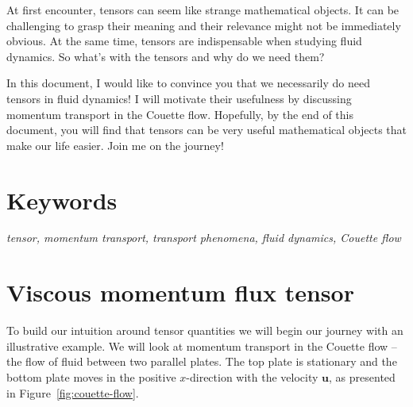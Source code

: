 \documentclass[10pt,twocolumn]{article}
\begin{document}
\setlength{\parindent}{0em}
\setlength{\parskip}{0.5em}

\small

At first encounter, tensors can seem like strange mathematical objects. It can be challenging to grasp their meaning and their relevance might not be immediately obvious. At the same time, tensors are indispensable when studying fluid dynamics. So what's with the tensors and why do we need them?

In this document, I would like to convince you that we necessarily do need tensors in fluid dynamics! I will motivate their usefulness by discussing momentum transport in the Couette flow. Hopefully, by the end of this document, you will find that tensors can be very useful mathematical objects that make our life easier. Join me on the journey!

\section*{Keywords}

\textit{tensor, momentum transport, transport phenomena, fluid dynamics, Couette flow}


\section*{Viscous momentum flux tensor}

To build our intuition around tensor quantities we will begin our journey with an illustrative example. We will look at momentum transport in the Couette flow -- the flow of fluid between two parallel plates. The top plate is stationary and the bottom plate moves in the positive $x$-direction with the velocity $\mathbf{u}$, as presented in Figure~\ref{fig:couette-flow}.
\end{document}
